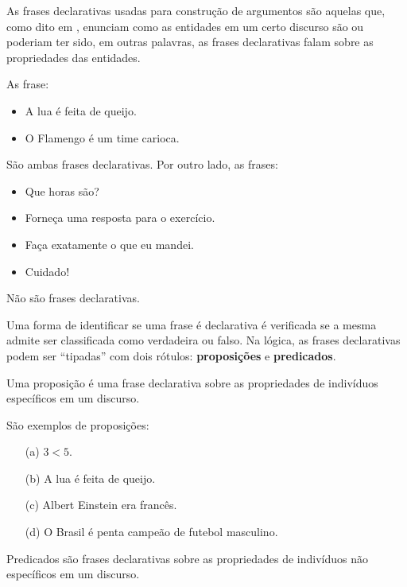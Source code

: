 As frases declarativas usadas para construção de argumentos são aquelas que, como dito em \cite{joaoPavao2014}, enunciam como as entidades em um certo discurso são ou poderiam ter sido, em outras palavras, as frases declarativas falam sobre as propriedades das entidades.

\begin{exemplo}\label{exe:FrasesDeclarativas}
	As frase:
	\begin{itemize}
		\item A lua é feita de queijo.
		\item O Flamengo é um time carioca.
	\end{itemize}
	São ambas frases declarativas. Por outro lado, as frases:
	\begin{itemize}
		\item Que horas são?
		\item Forneça uma resposta para o exercício.
		\item Faça exatamente o que eu mandei.
		\item Cuidado!
	\end{itemize}
	Não são frases declarativas.
\end{exemplo}

Uma forma de identificar se uma frase é declarativa é verificada se a mesma admite ser classificada como verdadeira ou falso. Na lógica, as frases declarativas podem ser ``tipadas'' com dois rótulos: \textbf{proposições} e \textbf{predicados}.

\begin{definicao}[Proposição]\label{def:Proposicao}
	Uma proposição é uma frase declarativa sobre as propriedades de indivíduos específicos em um discurso.
\end{definicao}

\begin{exemplo}\label{exe:Proposicoes}
	São exemplos de proposições:
	\begin{itemize}
		\item[(a)] $3 < 5$.
		\item[(b)] A lua é feita de queijo.
		\item[(c)] Albert Einstein era francês.
		\item[(d)] O Brasil é penta campeão de futebol masculino.
	\end{itemize}
\end{exemplo}

\begin{definicao}[Predicados]\label{def:Predicados}
	Predicados são frases declarativas sobre as propriedades de indivíduos não específicos em um discurso.
\end{definicao}


